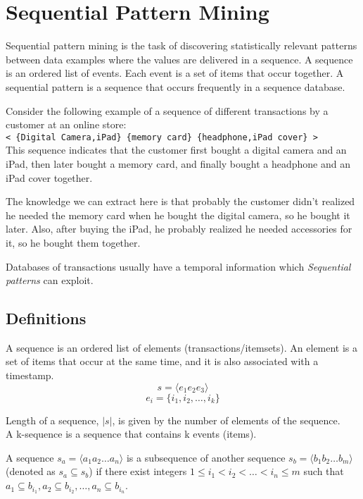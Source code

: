 \chapter{Sequential Pattern Mining}

Sequential pattern mining is the
task of discovering statistically relevant patterns between data examples
where the values are delivered in a sequence. A sequence is an ordered list
of events. Each event is a set of items that occur together. A sequential
pattern is a sequence that occurs frequently in a sequence database.


Consider the following example of a sequence of different transactions by a customer at an online store:\\
\verb|< {Digital Camera,iPad} {memory card} {headphone,iPad cover} >|\\
This sequence indicates that the customer first bought a digital camera and an iPad, then later bought a memory card, and finally bought a headphone and an iPad cover together.

The knowledge we can extract here is that probably the customer didn't realized he needed the memory card when he bought the digital camera, so he bought it later. Also, after buying the iPad, he probably realized he needed accessories for it, so he bought them together.

Databases of transactions usually have a temporal information which \textit{Sequential patterns} can exploit.

\section{Definitions}
A sequence is an ordered list of elements (transactions/itemsets). An element is a set of items that occur at the same time, and it is also associated with a timestamp.
\[s = \langle e_1 e_2 e_3 \rangle \]
\[e_i = \{i_1, i_2, \dots , i_k\}\]

Length of a sequence, $|s|$, is given by the number of elements of the
sequence.\\
A k-sequence is a sequence that contains k events (items).

A sequence $s_a = \langle a_1 a_2 \dots a_n \rangle$ is a subsequence of another sequence $s_b = \langle b_1 b_2 \dots b_m \rangle$ (denoted as $s_a \subseteq s_b$) if there exist integers $1 \leq i_1 < i_2 < \dots < i_n \leq m$ such that $a_1 \subseteq b_{i_1}, a_2 \subseteq b_{i_2}, \dots , a_n \subseteq b_{i_n}$.


